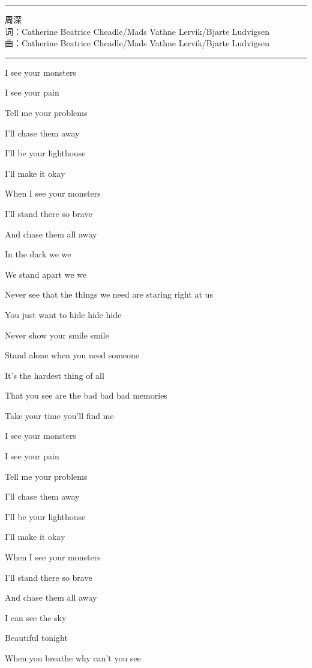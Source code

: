 \documentclass[]{ctexbook}
\begin{document}
\begin{center}\rule{0.5\linewidth}{0.5pt}\end{center}

周深\\
词：Catherine Beatrice Cheadle/Mads Vathne Lervik/Bjarte Ludvigsen\\
曲：Catherine Beatrice Cheadle/Mads Vathne Lervik/Bjarte Ludvigsen

\begin{center}\rule{0.5\linewidth}{0.5pt}\end{center}

I see your monsters

I see your pain

Tell me your problems

I'll chase them away

I'll be your lighthouse

I'll make it okay

When I see your monsters

I'll stand there so brave

And chase them all away

In the dark we we

We stand apart we we

Never see that the things we need are staring right at us

You just want to hide hide hide

Never show your smile smile

Stand alone when you need someone

It's the hardest thing of all

That you see are the bad bad bad memories

Take your time you'll find me

I see your monsters

I see your pain

Tell me your problems

I'll chase them away

I'll be your lighthouse

I'll make it okay

When I see your monsters

I'll stand there so brave

And chase them all away

I can see the sky

Beautiful tonight

When you breathe why can't you see
\end{document}
